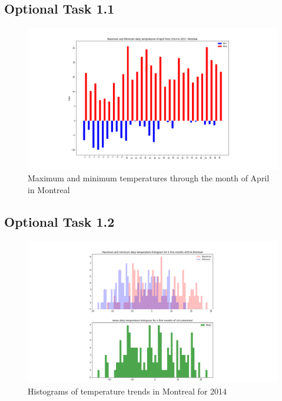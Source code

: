 \documentclass[12pt]{article}
\begin{document}
\pagebreak


\subsection{Optional Task 1.1}
\begin{figure}[!htbp]
\centering
\includegraphics[width=1.25\textwidth]{./docs/aprildaily.png} 
\caption{\scriptsize Maximum and minimum temperatures through the month of April in Montreal}
\label{Aprilmaxmin}		  
\end{figure}

\pagebreak

\subsection{Optional Task 1.2}
\begin{figure}[!htbp]
\centering
\includegraphics[width=1.0\textwidth]{./docs/histogram2014.png} 
\caption{\scriptsize Histograms of temperature trends in Montreal for 2014}
\label{hist2014}		  
\end{figure}
\end{document}
